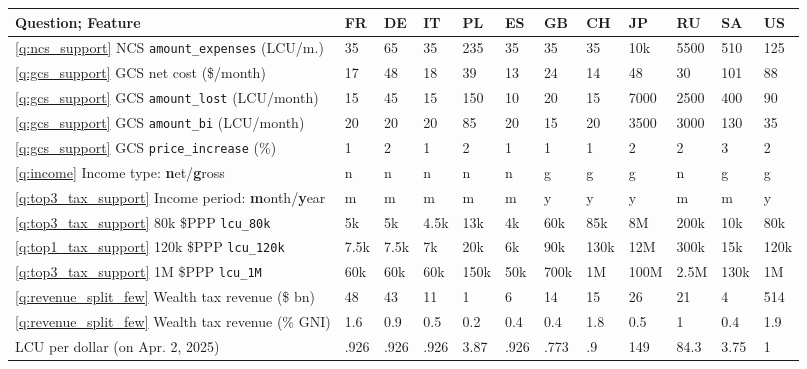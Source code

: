  \begin{tabular}{llllllllllll} \toprule  Question; Feature & FR & DE & IT & PL & ES & GB & CH & JP & RU & SA & US\\ \midrule \ref{q:ncs_support} NCS \verb|amount_expenses| (LCU/m.) & 35 & 65 & 35 & 235 & 35 & 35 & 35 & 10k & 5500 & 510 & 125\\ \ref{q:gcs_support} GCS net cost (\$/month) & 17 & 48 & 18 & 39 & 13 & 24 & 14 & 48 & 30 & 101 & 88\\ \ref{q:gcs_support} GCS \verb|amount_lost| (LCU/month) & 15 & 45 & 15 & 150 & 10 & 20 & 15 & 7000 & 2500 & 400 & 90\\ \ref{q:gcs_support} GCS \verb|amount_bi| (LCU/month) & 20 & 20 & 20 & 85 & 20 & 15 & 20 & 3500 & 3000 & 130 & 35\\ \ref{q:gcs_support} GCS \verb|price_increase| (\%) & 1~ & 2 & 1 & 2 & 1 & 1 & 1 & 2 & 2 & 3 & 2\\ \addlinespace \ref{q:income} Income type: \textbf{n}et/\textbf{g}ross & n & n & n & n & n & g & g & g & n & g & g\\ \ref{q:top3_tax_support} Income period: \textbf{m}onth/\textbf{y}ear & m & m & m & m & m & y & y & y & m & m & y\\ \ref{q:top3_tax_support} 80k \$PPP \verb|lcu_80k| & 5k & 5k & 4.5k & 13k & 4k & 60k & 85k & 8M & 200k & 10k & 80k\\ \ref{q:top1_tax_support} 120k \$PPP \verb|lcu_120k| & 7.5k & 7.5k & 7k & 20k & 6k & 90k & 130k & 12M & 300k & 15k & 120k\\ \ref{q:top3_tax_support} 1M \$PPP \verb|lcu_1M| & 60k & 60k & 60k & 150k & 50k & 700k & 1M & 100M & 2.5M & 130k & 1M\\ \addlinespace \ref{q:revenue_split_few} Wealth tax revenue (\$ bn) & 48 & 43 & 11 & 1 & 6 & 14 & 15 & 26 & 21 & 4 & 514\\ \ref{q:revenue_split_few} Wealth tax revenue (\% GNI) & 1.6 & 0.9 & 0.5 & 0.2 & 0.4 & 0.4 & 1.8 & 0.5 & 1 & 0.4 & 1.9\\ \quad LCU per dollar (on Apr. 2, 2025) & .926 & .926 & .926 & 3.87 & .926 & .773 & .9 & 149 & 84.3 & 3.75 & 1\\ \bottomrule \end{tabular}